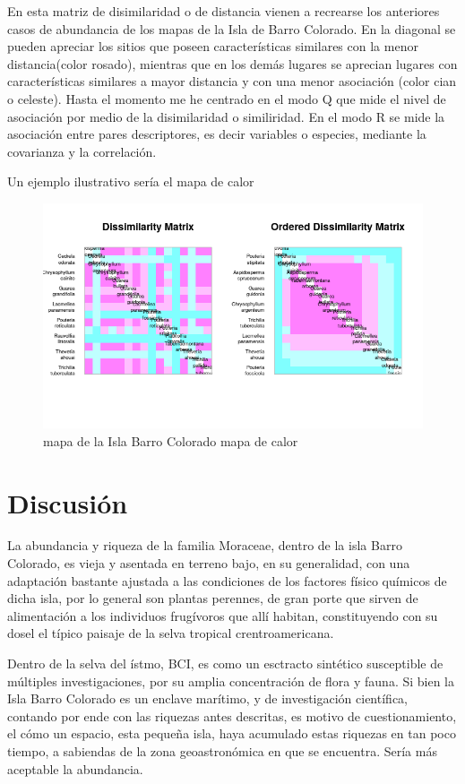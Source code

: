 \documentclass[11pt,]{article}
\begin{document}
En esta matriz de disimilaridad o de distancia vienen a recrearse los
anteriores casos de abundancia de los mapas de la Isla de Barro
Colorado. En la diagonal se pueden apreciar los sitios que poseen
características similares con la menor distancia(color rosado), mientras
que en los demás lugares se aprecian lugares con características
similares a mayor distancia y con una menor asociación (color cian o
celeste). Hasta el momento me he centrado en el modo Q que mide el nivel
de asociación por medio de la disimilaridad o similiridad. En el modo R
se mide la asociación entre pares descriptores, es decir variables o
especies, mediante la covarianza y la correlación.

Un ejemplo ilustrativo sería el mapa de calor

\begin{figure}
\centering
\includegraphics[width=1.00000\textwidth]{mapadecalor.png}
\caption{mapa de la Isla Barro Colorado mapa de calor
\label{fig:bci_map}}
\end{figure}

\section{Discusión}\label{discusiuxf3n}

La abundancia y riqueza de la familia Moraceae, dentro de la isla Barro
Colorado, es vieja y asentada en terreno bajo, en su generalidad, con
una adaptación bastante ajustada a las condiciones de los factores
físico químicos de dicha isla, por lo general son plantas perennes, de
gran porte que sirven de alimentación a los individuos frugívoros que
allí habitan, constituyendo con su dosel el típico paisaje de la selva
tropical crentroamericana.

Dentro de la selva del ístmo, BCI, es como un esctracto sintético
susceptible de múltiples investigaciones, por su amplia concentración de
flora y fauna. Si bien la Isla Barro Colorado es un enclave marítimo, y
de investigación científica, contando por ende con las riquezas antes
descritas, es motivo de cuestionamiento, el cómo un espacio, esta
pequeña isla, haya acumulado estas riquezas en tan poco tiempo, a
sabiendas de la zona geoastronómica en que se encuentra. Sería más
aceptable la abundancia.
\end{document}
